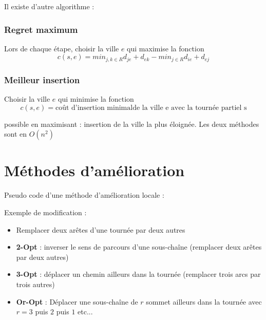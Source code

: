 \documentclass[11pt,a4paper]{report}
\begin{document}
\begin{algorithm}[H]

\end{algorithm}

Il existe d'autre algorithme :

\subsection{Regret maximum}
Lors de chaque étape, choisir la ville $e$ qui maximise la fonction
$$
c(s,e) = min_{j,k \in R}d_{je} + d_{ek} - min_{j \in R} d_{ie} + d_{ej}
$$ 

\subsection{Meilleur insertion}
Choisir la ville $e$ qui minimise la fonction
$$
c(s,e) = \text{coût d'insertion minimalde la ville e avec la tournée partiel s}
$$

possible en maximisant : insertion de la ville la plus éloignée. Les deux méthodes sont en $O(n^2)$


\chapter{Méthodes d'amélioration}

Pseudo code d'une méthode d'amélioration locale :

\begin{algorithm}[H]
\end{algorithm}

Exemple de modification :
\begin{itemize}
    \item Remplacer deux arêtes d'une tournée par deux autres
    \item \textbf{2-Opt} : inverser le sens de parcours d'une sous-chaîne (remplacer deux arêtes par deux autres)
    \item \textbf{3-Opt} : déplacer un chemin ailleurs dans la tournée (remplacer trois arcs par trois autres)
    \item \textbf{Or-Opt} : Déplacer une sous-chaîne de $r$ sommet ailleurs dans la tournée avec $r = 3$ puis $2$ puis $1$ etc...
\end{itemize}
\end{document}
